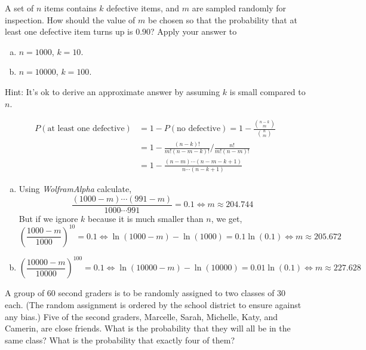 \documentclass[14pt]{elegantbook}
\begin{document}
    \begin{exercise*}[2]
        A set of $n$ items contains $k$ defective items, and $m$ are sampled randomly for inspection. How should the value of $m$ be chosen so that the probability that at least one defective item turns up is $0.90$? Apply your answer to 
        \begin{enumerate}[(a)]
            \item $n=1000$, $k=10$. 
            \item $n=10000$, $k=100$.
        \end{enumerate}
        Hint: It's ok to derive an approximate answer by assuming $k$ is small compared to $n$. 
    \end{exercise*}

    \begin{solution}
        \begin{align*}
            P(\text{at least one defective})&=1-P(\text{no defective})=1-\frac{\binom{n-k}{m}}{\binom{n}{m}}\\
            &=1-\frac{(n-k)!}{m!(n-m-k)!}\big/\frac{n!}{m!(n-m)!}\\
            &=1-\frac{(n-m)\cdots(n-m-k+1)}{n\cdots(n-k+1)}
        \end{align*}
        \begin{enumerate}[(a)]
            \item Using \emph{WolframAlpha} calculate, 
            \[\frac{(1000-m)\cdots(991-m)}{1000\cdots991}=0.1\Leftrightarrow m\approx 204.744 \]
            But if we ignore $k$ because it is much smaller than $n$, we get,
            \[
                \left(\frac{1000-m}{1000}\right)^{10}=0.1\Leftrightarrow \ln(1000-m)-\ln(1000)=0.1\ln(0.1)\Leftrightarrow m\approx 205.672
            \]
            \item \[
                \left(\frac{10000-m}{10000}\right)^{100}=0.1\Leftrightarrow \ln(10000-m)-\ln(10000)=0.01\ln(0.1)\Leftrightarrow m\approx 227.628
            \]
        \end{enumerate}
    \end{solution}

    \begin{exercise*}[3]
        A group of $60$ second graders is to be randomly assigned to two classes of $30$ each. (The random assignment is ordered by the school district to ensure against any bias.) Five of the second graders, Marcelle, Sarah, Michelle, Katy, and Camerin, are close friends. What is the probability that they will all be in the same class? What is the probability that exactly four of them? 
    \end{exercise*}
\end{document}
